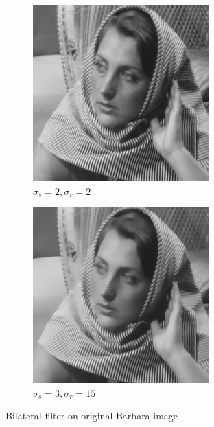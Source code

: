 \documentclass[a4paper, landscape]{article}
\begin{document}
\begin{figure}
\begin{subfigure}{0.33\linewidth}
        \includegraphics[width=\linewidth]{barbara256,σ_spatial2,σ_range2.png}
        \caption{$\sigma_s=2, \sigma_r=2$}
    \end{subfigure}
    \begin{subfigure}{0.33\linewidth}
        \centering
        \includegraphics[width=\linewidth]{barbara256,σ_spatial3,σ_range15.png}
        \caption{$\sigma_s=3, \sigma_r=15$}
    \end{subfigure}
    \caption{Bilateral filter on original Barbara image}
    \label{fig:bs}
\end{figure}
\end{document}

